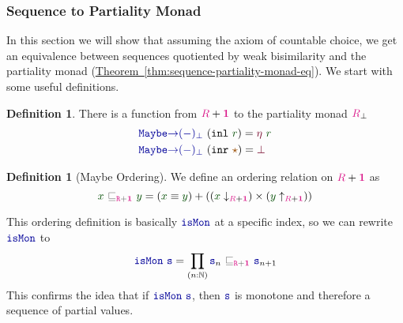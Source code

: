 \documentclass[twoside,11pt,openright]{report}
\theoremstyle{plain} %
\theoremstyle{definition}
\newtheorem{defn}[thm]{Definition}%
\theoremstyle{remark}
\newcommand*{\thmref}[1]{\hyperref[thm:#1]{Theorem~\ref*{thm:#1}}} %
\newcommand*{\term}[1]{\textcolor{green!30!black}{#1}} %
\newcommand*{\type}[1]{\textcolor{magenta!90!black}{#1}}
\newcommand*{\unit}{\type{\textbf{1}}}
\newcommand*{\relation}[1]{\textcolor{gray!75!black}{\ensuremath{\mathtt{#1}}}}
\newcommand*{\constant}[1]{\textcolor{orange!60!black}{\ensuremath{\mathtt{#1}}}}
\newcommand*{\function}[1]{\textcolor{blue!60!black}{\ensuremath{\mathtt{#1}}}}
\newcommand*{\constructor}[1]{\textcolor{purple!60!black}{\ensuremath{\mathtt{#1}}}}
\newcommand*{\unitelem}{\constant{\star}} %
\begin{document}
\subsubsection{Sequence to Partiality Monad}
\label{sec:sequences-to-partiality-monad}
In this section we will show that assuming the axiom of countable choice, we get an equivalence between sequences quotiented by weak bisimilarity and the partiality monad (\thmref{sequence-partiality-monad-eq}). We start with some useful definitions.
\begin{defn} There is a function from \(\type{R} + \unit\) to the partiality monad \(\type{R}_\bot\)
  \begin{equation}
    \begin{aligned}
      &\function{Maybe{\rightarrow}(-)_\bot}~(\mathtt{inl}~\term{r}) = \constructor{\eta}~\term{r} \\
      &\function{Maybe{\rightarrow}(-)_\bot}~(\mathtt{inr}~\unitelem) = \constructor{\bot}
    \end{aligned}
  \end{equation}
\end{defn}
\begin{defn}[Maybe Ordering]
  \label{eq:maybe-order}
  We define an ordering relation on \(\type{R} + \unit\) as 
  \begin{equation}
    \term{x}~\relation{\sqsubseteq_{\type{R} + \unit}}~\term{y} = (\term{x} \equiv \term{y}) + ((\term{x}  \downarrow_{\type{R} + \unit}) \times (\term{y} \uparrow_{\type{R} + \unit}))
  \end{equation}
\end{defn}
\noindent This ordering definition is basically \(\function{isMon}\) at a specific index, so we can rewrite \(\function{isMon}\) to
\begin{equation}
  \function{isMon}~\function{s} = \prod_{(n : \mathbb{N})} \function{s}_n~\relation{\sqsubseteq_{\type{R} + \unit}}~\function{s}_{n+1}
\end{equation}
This confirms the idea that if \(\function{isMon}~\function{s}\), then \(\function{s}\) is monotone and therefore a sequence of partial values.
\end{document}
